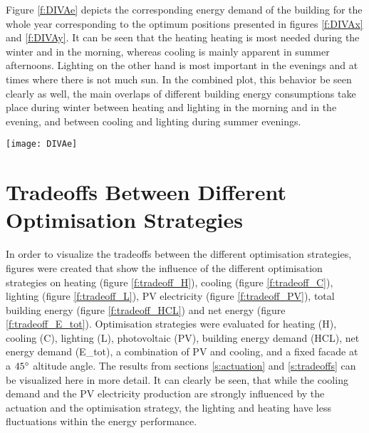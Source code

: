 	Figure \ref{f:DIVAe} depicts the corresponding energy demand of the building for the whole year corresponding to the optimum positions presented in figures \ref{f:DIVAx} and \ref{f:DIVAy}. It can be seen that the heating heating is most needed during the winter and in the morning, whereas cooling is mainly apparent in summer afternoons. Lighting on the other hand is most important in the evenings and at times where there is not much sun. In the combined plot, this behavior be seen clearly as well, the main overlaps of different building energy consumptions take place during winter between heating and lighting in the morning and in the evening, and between cooling and lighting during summer evenings. 

	\begin{figure*}
		\begin{center}
		\texttt{[image: DIVAe]}
		\caption{Carpet plots detailing the net energy consumption. Each square represents the total energy consumption for that specific hour of the entire month. Red colours detail the energy demand, while blue colours detail the energy supply.}
		\label{f:DIVAe}
		\end{center}
	\end{figure*}
	
\section{Tradeoffs Between Different Optimisation Strategies}
	
	In order to visualize the tradeoffs between the different optimisation strategies, figures were created that show the influence of the different optimisation strategies on heating (figure \ref{f:tradeoff_H}), cooling (figure \ref{f:tradeoff_C}), lighting (figure \ref{f:tradeoff_L}), PV electricity (figure \ref{f:tradeoff_PV}), total building energy (figure \ref{f:tradeoff_HCL}) and net energy (figure \ref{f:tradeoff_E_tot}). Optimisation strategies were evaluated for heating (H), cooling (C), lighting (L), photovoltaic (PV), building energy demand (HCL), net energy demand (E\_tot), a combination of PV and cooling, and a fixed facade at a $45\degree$ altitude angle. The results from sections \ref{s:actuation} and \ref{s:tradeoffs} can be visualized here in more detail. It can clearly be seen, that while the cooling demand and the PV electricity production are strongly influenced by the actuation and the optimisation strategy, the lighting and heating have less fluctuations within the energy performance. 

